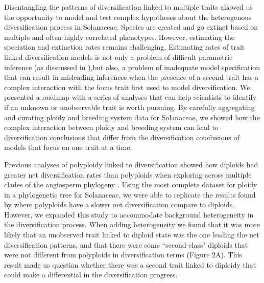 Disentangling the patterns of diversification linked to  multiple traits allowed us the opportunity to model and test complex hypotheses about the heterogenous diversification process in Solanaceae.
Species are created and go extinct based on multiple and often highly correlated phenotypes. However, estimating the speciation and extinction rates remains challenging. Estimating rates of trait linked diversification models is not only a problem of difficult parametric inference (as disscussed in  \citet{rabosky_2010, beaulieu_2015}),but also, a problem of inadequate model specification that can result in misleading inferences when the presence of a second trait has a complex interaction with the focus trait first used to model diversification. We presented a roadmap with a series of analyses that can help scientists to identify if an unknown or unobservable trait is worth pursuing. By carefully aggregating and curating ploidy and breeding system data for Solanaceae, we showed how  the complex interaction between ploidy and breeding system  can lead to diversification conclusions that differ from the diversification conclusions of models that focus on one trait at a time.

Previous analyses of polyploidy linked to diversification showed how diploids had greater net diversification rates than polyploids when exploring across multiple clades of the angiosperm phylogeny \citet{mayrose_2011, mayrose_2015}. 
Using the most complete dataset for ploidy in a phylogenetic tree for Solanaceae, we were able to replicate the results found by \citet{mayrose_2011} where polyploids have a slower net diversification compare to diploids.
However, we expanded this study to accommodate  background heterogeneity in the diversification process.
When adding heterogeneity we found that it was more likely that an unobserved trait linked to diploid state was the one leading the net diversification patterns, and that there were some ``second-class"  diploids that were not different from  polyploids  in diversification terms (Figure 2A).
This result made us question whether there was a second trait linked to diploidy that could make a differential in the diversification progress.

